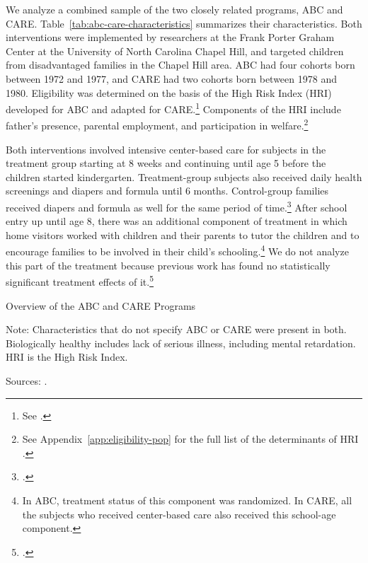 We analyze a combined sample of the two closely related programs, ABC and CARE. Table~\ref{tab:abc-care-characteristics} summarizes their characteristics. Both interventions were implemented by researchers at the Frank Porter Graham Center at the University of North Carolina Chapel Hill, and targeted children from disadvantaged families in the Chapel Hill area. ABC had four cohorts born between 1972 and 1977, and CARE had two cohorts born between 1978 and 1980. Eligibility was determined on the basis of the High Risk Index (HRI) developed for ABC and adapted for CARE.\footnote{See \citet{Campbell_Wasik_etal_2008_ECRQ}.} Components of the HRI include father's presence, parental employment, and participation in welfare.\footnote{See Appendix~\ref{app:eligibility-pop} for the full list of the determinants of HRI \citep{Ramey_Smith_1977_AJMD, Wasik_Ramey_etal_1990_CD, Ramey_Campbell_1991_childreninpoverty}.}

Both interventions involved intensive center-based care for subjects in the treatment group starting at 8 weeks and continuing until age 5 before the children started kindergarten. Treatment-group subjects also received daily health screenings and diapers and formula until 6 months. Control-group families received diapers and formula as well for the same period of time.\footnote{\citet{Wasik_Ramey_etal_1990_CD}.}  After school entry up until age 8, there was an additional component of treatment in which home visitors worked with children and their parents to tutor the children and to encourage families to be involved in their child's schooling.\footnote{In ABC, treatment status of this component was randomized. In CARE, all the subjects who received center-based care also received this school-age component.} We do not analyze this part of the treatment because previous work has found no  statistically significant treatment effects of it.\footnote{\citet{Campbell_Ramey_etal_2002_ADS,Campbell_Conti_etal_2014_EarlyChildhoodInvestments}.}

\begin{table}[H]
\centering
\caption{Overview of the ABC and CARE Programs}
\label{tab:abc-care-characteristics}
\begin{threeparttable}
	
\begin{tablenotes}
\footnotesize
\item Note: Characteristics that do not specify ABC or CARE were present in both. Biologically healthy includes lack of serious illness, including mental retardation. HRI is the High Risk Index. \\
\item Sources: \citet{Ramey_Collier_etal_1976_CarolinaAbecedarianProject,Ramey_Smith_1977_AJMD,Ramey_etal_1985_Project-CARE_TiECSE,Wasik_Ramey_etal_1990_CD,Ramey_Campbell_1991_childreninpoverty}.
\end{tablenotes}
\end{threeparttable}
\end{table}

